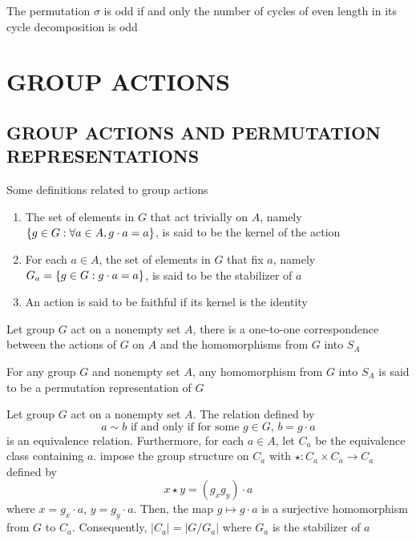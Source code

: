 \begin{proposition}
	The permutation $\sigma$ is odd if and only the number of cycles of even length in its cycle decomposition is odd
\end{proposition}

\section{GROUP ACTIONS}

\subsection{GROUP ACTIONS AND PERMUTATION REPRESENTATIONS}

\begin{definition}
	Some definitions related to group actions
	\begin{enumerate}
		\item The set of elements in $G$ that act trivially on $A$, namely $\{g \in G: \forall a \in A, g \cdot a = a\}$, is said to be the kernel of the action
		\item For each $a \in A$, the set of elements in $G$ that fix $a$, namely $G_a = \{g \in G: g \cdot a = a\}$, is said to be the stabilizer of $a$
		\item An action is said to be faithful if its kernel is the identity
	\end{enumerate}
\end{definition}

\begin{proposition}
	Let group $G$ act on a nonempty set $A$, there is a one-to-one correspondence between the actions of $G$ on $A$ and the homomorphisms from $G$ into $S_A$
\end{proposition}

\begin{definition}
	For any group $G$ and nonempty set $A$, any homomorphism from $G$ into $S_A$ is said to be a permutation representation of $G$
\end{definition}

\begin{proposition}
	Let group $G$ act on a nonempty set $A$. The relation defined by
	\[
	a \sim b \text{ if and only if for some $g \in G$, } b = g \cdot a
	\]
	is an equivalence relation. Furthermore, for each $a \in A$, let $C_a$ be the equivalence class containing $a$. impose the group structure on $C_a$ with $\star: C_a \times C_a \to C_a$ defined by
	\[
	x \star y = (g_x g_y) \cdot a
	\]
	where $x = g_x \cdot a$, $y = g_y \cdot a$. Then, the map $g \mapsto g \cdot a$ is a surjective homomorphism from $G$ to $C_a$. Consequently, $|C_a| = |G / G_a|$ where $G_a$ is the stabilizer of $a$
\end{proposition}


